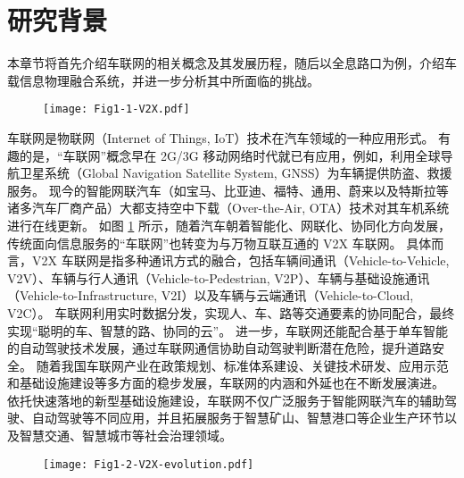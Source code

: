 \section{研究背景}\label{section 1-2}

本章节将首先介绍车联网的相关概念及其发展历程，随后以全息路口为例，介绍车载信息物理融合系统，并进一步分析其中所面临的挑战。

\begin{figure}[h]
	\centering
\texttt{[image: Fig1-1-V2X.pdf]}
	\label{fig 1-1}
\end{figure}

车联网是物联网（Internet of Things, IoT）技术在汽车领域的一种应用形式。
有趣的是，“车联网”概念早在 2G/3G 移动网络时代就已有应用，例如，利用全球导航卫星系统（Global Navigation Satellite System, GNSS）为车辆提供防盗、救援服务。
现今的智能网联汽车（如宝马、比亚迪、福特、通用、蔚来以及特斯拉等诸多汽车厂商产品）大都支持空中下载（Over-the-Air, OTA）技术对其车机系统进行在线更新。
如图 \ref{fig 1-1} 所示，随着汽车朝着智能化、网联化、协同化方向发展，传统面向信息服务的“车联网”也转变为与万物互联互通的 V2X 车联网。
具体而言，V2X 车联网是指多种通讯方式的融合，包括车辆间通讯（Vehicle-to-Vehicle, V2V）、车辆与行人通讯（Vehicle-to-Pedestrian, V2P）、车辆与基础设施通讯（Vehicle-to-Infrastructure, V2I）以及车辆与云端通讯（Vehicle-to-Cloud, V2C）。
车联网利用实时数据分发，实现人、车、路等交通要素的协同配合，最终实现“聪明的车、智慧的路、协同的云”。
进一步，车联网还能配合基于单车智能的自动驾驶技术发展，通过车联网通信协助自动驾驶判断潜在危险，提升道路安全。
随着我国车联网产业在政策规划、标准体系建设、关键技术研发、应用示范和基础设施建设等多方面的稳步发展，车联网的内涵和外延也在不断发展演进\cite{zhong2021che}。
依托快速落地的新型基础设施建设，车联网不仅广泛服务于智能网联汽车的辅助驾驶、自动驾驶等不同应用，并且拓展服务于智慧矿山、智慧港口等企业生产环节以及智慧交通、智慧城市等社会治理领域。

\begin{figure}[h]
	\centering
\texttt{[image: Fig1-2-V2X-evolution.pdf]}
	\label{fig 1-2}
\end{figure}

